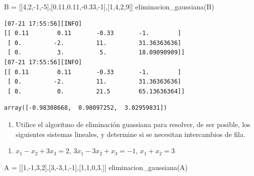 \documentclass[
  letterpaper,
  DIV=11,
  numbers=noendperiod]{scrartcl}
\newenvironment{Shaded}{\begin{snugshade}}{\end{snugshade}}
\newcommand{\DecValTok}[1]{\textcolor[rgb]{0.68,0.00,0.00}{#1}}
\newcommand{\FloatTok}[1]{\textcolor[rgb]{0.68,0.00,0.00}{#1}}
\newcommand{\NormalTok}[1]{\textcolor[rgb]{0.00,0.23,0.31}{#1}}
\newcommand{\OperatorTok}[1]{\textcolor[rgb]{0.37,0.37,0.37}{#1}}
\providecommand{\tightlist}{%
  \setlength{\itemsep}{0pt}\setlength{\parskip}{0pt}}\usepackage{longtable,booktabs,array}
\begin{document}
\begin{Shaded}
\begin{Highlighting}[]
\NormalTok{B }\OperatorTok{=}\NormalTok{ [[}\DecValTok{4}\NormalTok{,}\DecValTok{2}\NormalTok{,}\OperatorTok{{-}}\DecValTok{1}\NormalTok{,}\OperatorTok{{-}}\DecValTok{5}\NormalTok{],[}\FloatTok{0.11}\NormalTok{,}\FloatTok{0.11}\NormalTok{,}\OperatorTok{{-}}\FloatTok{0.33}\NormalTok{,}\OperatorTok{{-}}\DecValTok{1}\NormalTok{],[}\DecValTok{1}\NormalTok{,}\DecValTok{4}\NormalTok{,}\DecValTok{2}\NormalTok{,}\DecValTok{9}\NormalTok{]]}
\NormalTok{eliminacion\_gaussiana(B)}
\end{Highlighting}
\end{Shaded}

\begin{verbatim}
[07-21 17:55:56][INFO] 
[[ 0.11        0.11       -0.33       -1.        ]
 [ 0.         -2.         11.         31.36363636]
 [ 0.          3.          5.         18.09090909]]
[07-21 17:55:56][INFO] 
[[ 0.11        0.11       -0.33       -1.        ]
 [ 0.         -2.         11.         31.36363636]
 [ 0.          0.         21.5        65.13636364]]
\end{verbatim}

\begin{verbatim}
array([-0.98308668,  0.98097252,  3.02959831])
\end{verbatim}

\begin{enumerate}
\def\labelenumi{\arabic{enumi}.}
\setcounter{enumi}{2}
\tightlist
\item
  Utilice el algoritmo de eliminación guassiana para resolver, de ser
  posible, los siguientes sistemas lineales, y determine si se necesitan
  intercambios de fila.
\end{enumerate}

\begin{enumerate}
\def\labelenumi{\alph{enumi}.}
\tightlist
\item
  \(x_1 - x_2 +3 x_3 = 2\), \(3x_1 -3x_2 +x_3 = -1\), \(x_1 + x_2 = 3\)
\end{enumerate}

\begin{Shaded}
\begin{Highlighting}[]
\NormalTok{A }\OperatorTok{=}\NormalTok{ [[}\DecValTok{1}\NormalTok{,}\OperatorTok{{-}}\DecValTok{1}\NormalTok{,}\DecValTok{3}\NormalTok{,}\DecValTok{2}\NormalTok{],[}\DecValTok{3}\NormalTok{,}\OperatorTok{{-}}\DecValTok{3}\NormalTok{,}\DecValTok{1}\NormalTok{,}\OperatorTok{{-}}\DecValTok{1}\NormalTok{],[}\DecValTok{1}\NormalTok{,}\DecValTok{1}\NormalTok{,}\DecValTok{0}\NormalTok{,}\FloatTok{3.}\NormalTok{]]}
\NormalTok{eliminacion\_gaussiana(A)}
\end{Highlighting}
\end{Shaded}
\end{document}

